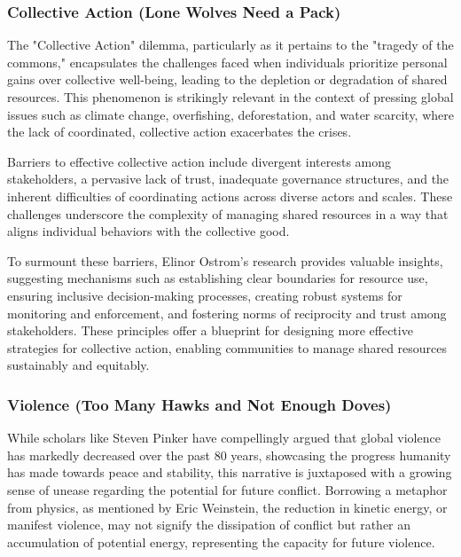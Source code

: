 \documentclass{article}
\begin{document}
\subsubsection{Collective Action (Lone Wolves Need a Pack)}
\label{sec:CollectiveAction}

The "Collective Action" dilemma, particularly as it pertains to the "tragedy of the commons," encapsulates the challenges faced when individuals prioritize personal gains over collective well-being, leading to the depletion or degradation of shared resources\cite{Hardin1968}. This phenomenon is strikingly relevant in the context of pressing global issues such as climate change, overfishing, deforestation, and water scarcity, where the lack of coordinated, collective action exacerbates the crises\cite{IPCC2014, FAO2020, WorldBank2019}.

Barriers to effective collective action include divergent interests among stakeholders, a pervasive lack of trust, inadequate governance structures, and the inherent difficulties of coordinating actions across diverse actors and scales. These challenges underscore the complexity of managing shared resources in a way that aligns individual behaviors with the collective good\cite{Ostrom1990}.

To surmount these barriers, Elinor Ostrom's research provides valuable insights, suggesting mechanisms such as establishing clear boundaries for resource use, ensuring inclusive decision-making processes, creating robust systems for monitoring and enforcement, and fostering norms of reciprocity and trust among stakeholders\cite{Ostrom1990}. These principles offer a blueprint for designing more effective strategies for collective action, enabling communities to manage shared resources sustainably and equitably.

\subsubsection{Violence (Too Many Hawks and Not Enough Doves)}
\label{sec:Violence}

While scholars like Steven Pinker have compellingly argued that global violence has markedly decreased over the past 80 years, showcasing the progress humanity has made towards peace and stability\cite{Pinker2011}, this narrative is juxtaposed with a growing sense of unease regarding the potential for future conflict. Borrowing a metaphor from physics, as mentioned by Eric Weinstein, the reduction in kinetic energy, or manifest violence, may not signify the dissipation of conflict but rather an accumulation of potential energy, representing the capacity for future violence\cite{WeinsteinPodcast}.
\end{document}
